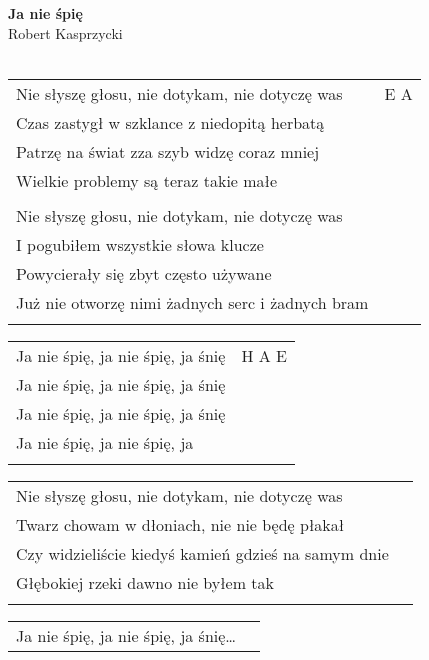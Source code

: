\documentclass[a5paper]{article}
\begin{document}


\noindent
\fontsize{12pt}{15pt}\selectfont
\textbf{Ja nie śpię} \\
\fontsize{8pt}{10pt}\selectfont
Robert Kasprzycki \\ \\
\fontsize{10pt}{12pt}\selectfont
{}
\begin{tabular}{@{}p{8.50cm}p{3cm}@{}}
\noindent
Nie słyszę głosu, nie dotykam, nie dotyczę was & E A \\
Czas zastygł w szklance z niedopitą herbatą	\\
Patrzę na świat zza szyb widzę coraz mniej	\\
Wielkie problemy są teraz takie małe \\ \\

Nie słyszę głosu, nie dotykam, nie dotyczę was \\
I pogubiłem wszystkie słowa klucze \\
Powycierały się zbyt często używane \\
Już nie otworzę nimi żadnych serc i żadnych bram \\ \\
\end{tabular}

\noindent
\begin{tabular}{@{}p{7.50cm}p{3cm}@{}}
Ja nie śpię, ja nie śpię, ja śnię & H A E \\
Ja nie śpię, ja nie śpię, ja śnię	\\
Ja nie śpię, ja nie śpię, ja śnię	\\		
Ja nie śpię, ja nie śpię, ja \\ \\
\end{tabular}

\noindent
\begin{tabular}{@{}p{10.50cm}p{3cm}@{}}
Nie słyszę głosu, nie dotykam, nie dotyczę was \\
Twarz chowam w dłoniach, nie nie będę płakał \\
Czy widzieliście kiedyś kamień gdzieś na samym dnie \\
Głębokiej rzeki dawno nie byłem tak \\ \\
\end{tabular}

\noindent
\begin{tabular}{@{}p{7.50cm}p{3cm}@{}}
Ja nie śpię, ja nie śpię, ja śnię…
\end{tabular}
\end{document}
